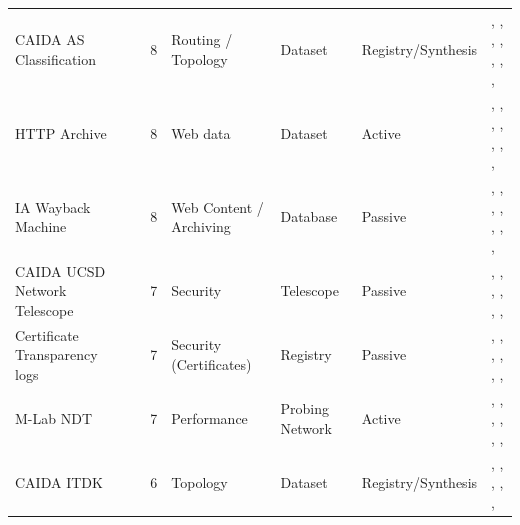 \begin{table}[h!]
\begin{tabular}{lllllll}
CAIDA AS Classification & \cite{caidaasclassification} & 8 & Routing / Topology & Dataset & Registry/Synthesis & \cite{10.1145/3618257.3624811}, \cite{10.1007/978-3-030-72582-2_25}, \cite{10.1007/978-3-031-28486-1_4}, \cite{10.1007/978-3-031-28486-1_16}, \cite{10.1007/978-3-031-85960-1_18}, \cite{10.1145/3777912.3839831}, \cite{10.1007/978-3-032-18268-5_5}, \cite{10.1145/3777912.3839828} \\
HTTP Archive & \cite{httparchive} & 8 & Web data & Dataset & Active & \cite{10.1145/3618257.3624836}, \cite{10.1145/3487552.3487832}, \cite{10.1007/978-3-030-72582-2_5}, \cite{10.1007/978-3-030-72582-2_26}, \cite{10.1007/978-3-031-85960-1_8}, \cite{10.1007/978-3-032-18268-5_13}, \cite{10.1145/3777912.3839817}, \cite{10.1145/3777912.3839792} \\
IA Wayback Machine & \cite{wayback-machine} & 8 & Web Content / Archiving & Database & Passive & \cite{10.1145/3730567.3764507}, \cite{10.1145/3618257.3624832}, \cite{10.1145/3517745.3561451}, \cite{10.1145/3487552.3487816}, \cite{10.1007/978-3-030-98785-5_19}, \cite{10.1145/3777912.3809151}, \cite{10.1145/3777912.3839806}, \cite{10.1145/3777912.3809147} \\
CAIDA UCSD Network Telescope & \cite{caidaucsdnt} & 7 & Security & Telescope & Passive & \cite{10.1145/3646547.3688426}, \cite{10.1145/3646547.3688451}, \cite{10.1145/3517745.3561458}, \cite{10.1145/3487552.3487833}, \cite{10.1145/3487552.3487840}, \cite{10.1145/3777912.3839790}, \cite{10.1007/978-3-032-18268-5_14} \\
Certificate Transparency logs & \cite{ct_logs} & 7 & Security (Certificates) & Registry & Passive & \cite{10.1145/3517745.3561440}, \cite{10.1145/3517745.3561423}, \cite{10.1145/3517745.3561434}, \cite{10.1007/978-3-030-72582-2_17}, \cite{10.1145/3777912.3809146}, \cite{10.1145/3777912.3839803}, \cite{10.1145/3777912.3809148} \\
M-Lab NDT & \cite{mlabndt} & 7 & Performance & Probing Network & Active & \cite{10.1145/3646547.3689007}, \cite{10.1145/3646547.3688441}, \cite{10.1145/3646547.3688411}, \cite{10.1145/3618257.3624828}, \cite{10.1145/3618257.3624831}, \cite{10.1145/3517745.3561449}, \cite{10.1145/3777912.3839831} \\
CAIDA ITDK & \cite{caida_itdk} & 6 & Topology & Dataset & Registry/Synthesis & \cite{10.1145/3618257.3624818}, \cite{10.1145/3517745.3561422}, \cite{10.1145/3487552.3487848}, \cite{10.1007/978-3-031-85960-1_4}, \cite{10.1145/3777912.3839831}, \cite{10.1145/3777912.3839791} \\

\end{tabular}
\end{table}
